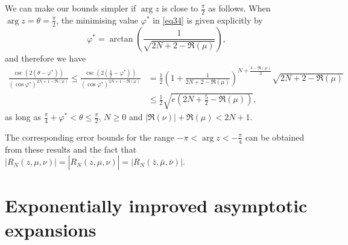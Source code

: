 \documentclass[a4paper,twoside,10pt]{amsart}
\numberwithin{equation}{section}
\begin{document}
We can make our bounds simpler if $\arg z$ is close to $\frac{\pi}{2}$ as follows. When $\arg z = \theta = \frac{\pi}{2}$, the minimising value $\varphi^\ast$ in \eqref{eq34} is given explicitly by
\[
\varphi^\ast  = \arctan \left( {\frac{1}{{\sqrt {2N + 2 - \Re \left( \mu  \right)} }}} \right),
\]
and therefore we have
\begin{align*}
\frac{{\csc \left( {2\left( {\theta  - \varphi^\ast } \right)} \right)}}{{\left( {\cos \varphi^\ast } \right)^{2N + 1 - \Re \left( \mu  \right)} }} \le \frac{{\csc \left( {2\left( {\frac{\pi }{2} - \varphi^\ast } \right)} \right)}}{{\left( {\cos \varphi^\ast } \right)^{2N + 1 - \Re \left( \mu  \right)} }} & = \frac{1}{2}\left( {1 + \frac{1}{{2N + 2 - \Re \left( \mu  \right)}}} \right)^{N + \frac{{3-\Re \left( \mu  \right)}}{2}} \sqrt {2N + 2 - \Re \left( \mu  \right)} \\ & \le \frac{1}{2}\sqrt {e\left( {2N + \frac{5}{2} - \Re \left( \mu  \right)} \right)}, 
\end{align*}
as long as $\frac{\pi }{4} + \varphi^\ast < \theta  \leq \frac{\pi }{2}$, $N\geq 0$ and $\left| {\Re \left( \nu  \right)} \right| + \Re \left( \mu  \right)< 2N + 1$.

The corresponding error bounds for the range $-\pi<\arg z <-\frac{\pi}{4}$ can be obtained from these results and the fact that $\left| {R_N \left( {z,\mu ,\nu } \right)} \right| = \left| {\overline {R_N \left( {z,\mu ,\nu } \right)} } \right| = \left| {R_N \left( {\bar z,\bar \mu ,\bar \nu } \right)} \right|$.

\section{Exponentially improved asymptotic expansions}\label{section4}
\end{document}
